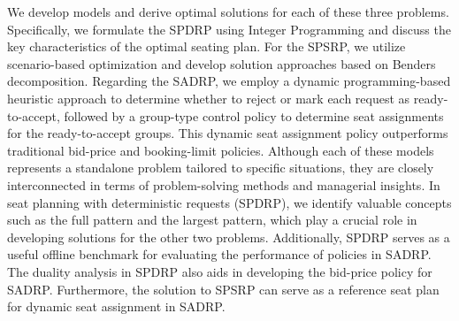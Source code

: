 
We develop models and derive optimal solutions for each of these three problems. Specifically, we formulate the SPDRP using Integer Programming and discuss the key characteristics of the optimal seating plan. For the SPSRP, we utilize scenario-based optimization and develop solution approaches based on Benders decomposition. Regarding the SADRP, we employ a dynamic programming-based heuristic approach to determine whether to reject or mark each request as ready-to-accept, followed by a group-type control policy to determine seat assignments for the ready-to-accept groups. This dynamic seat assignment policy outperforms traditional bid-price and booking-limit policies. Although each of these models represents a standalone problem tailored to specific situations, they are closely interconnected in terms of problem-solving methods and managerial insights. In seat planning with deterministic requests (SPDRP), we identify valuable concepts such as the full pattern and the largest pattern, which play a crucial role in developing solutions for the other two problems. Additionally, SPDRP serves as a useful offline benchmark for evaluating the performance of policies in SADRP. The duality analysis in SPDRP also aids in developing the bid-price policy for SADRP. Furthermore, the solution to SPSRP can serve as a reference seat plan for dynamic seat assignment in SADRP. 



